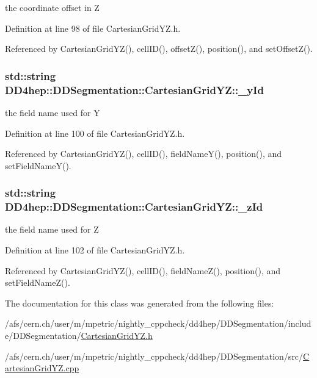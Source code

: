 the coordinate offset in Z 

Definition at line 98 of file CartesianGridYZ.h.

Referenced by CartesianGridYZ(), cellID(), offsetZ(), position(), and setOffsetZ().\hypertarget{class_d_d4hep_1_1_d_d_segmentation_1_1_cartesian_grid_y_z_ad7b9edca36f4b35162b3b49b3763e245}{
\subsubsection[{\_\-yId}]{\setlength{\rightskip}{0pt plus 5cm}std::string {\bf DD4hep::DDSegmentation::CartesianGridYZ::\_\-yId}}}
\label{class_d_d4hep_1_1_d_d_segmentation_1_1_cartesian_grid_y_z_ad7b9edca36f4b35162b3b49b3763e245}


the field name used for Y 

Definition at line 100 of file CartesianGridYZ.h.

Referenced by CartesianGridYZ(), cellID(), fieldNameY(), position(), and setFieldNameY().\hypertarget{class_d_d4hep_1_1_d_d_segmentation_1_1_cartesian_grid_y_z_ad2f85ca98f4c77d7dcad2f949b8ea7e1}{
\subsubsection[{\_\-zId}]{\setlength{\rightskip}{0pt plus 5cm}std::string {\bf DD4hep::DDSegmentation::CartesianGridYZ::\_\-zId}}}
\label{class_d_d4hep_1_1_d_d_segmentation_1_1_cartesian_grid_y_z_ad2f85ca98f4c77d7dcad2f949b8ea7e1}


the field name used for Z 

Definition at line 102 of file CartesianGridYZ.h.

Referenced by CartesianGridYZ(), cellID(), fieldNameZ(), position(), and setFieldNameZ().

The documentation for this class was generated from the following files:\begin{DoxyCompactItemize}
\item 
/afs/cern.ch/user/m/mpetric/nightly\_\-cppcheck/dd4hep/DDSegmentation/include/DDSegmentation/\hyperlink{_d_d_segmentation_2include_2_d_d_segmentation_2_cartesian_grid_y_z_8h}{CartesianGridYZ.h}\item 
/afs/cern.ch/user/m/mpetric/nightly\_\-cppcheck/dd4hep/DDSegmentation/src/\hyperlink{_d_d_segmentation_2src_2_cartesian_grid_y_z_8cpp}{CartesianGridYZ.cpp}\end{DoxyCompactItemize}
